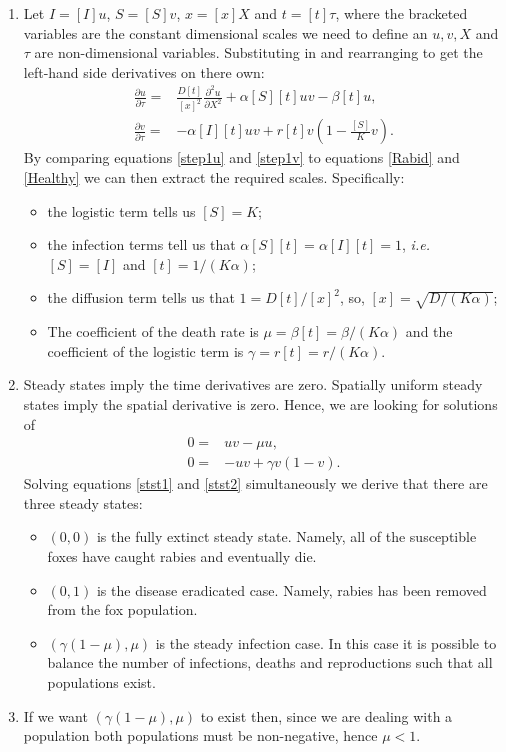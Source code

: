 \documentclass[10pt]{article}
\newcommand{\D}[2]{\frac{\partial #1}{\partial #2}}
\newcommand{\DD}[2]{\frac{\partial^2 #1}{\partial #2^2}}
\newcommand{\eqns}[2]{equations \eqref{#1} and \eqref{#2}}
\newcommand{\ie}{\emph{i.e.} }
\renewcommand{\l}{\left(}
\renewcommand{\r}{\right)}
\begin{document}
\begin{Answ}
\begin{enumerate}
\item Let $I=[I]u$, $S=[S]v$, $x=[x]X$ and $t=[t]\tau$, where the bracketed variables are the constant dimensional scales we need to define an $u, v, X$ and $\tau$ are non-dimensional variables. Substituting in and rearranging to get the left-hand side derivatives on there own:
\begin{align}
\D{u}{\tau}=&\frac{D[t]}{[x]^2}\DD{u}{X}+\alpha[S][t] uv-\beta [t]u,\label{step1u}\\
\D{v}{\tau}=&-\alpha[I][t] uv+r[t]v\l 1-\frac{[S]}{K}v\r.\label{step1v}
\end{align}
By comparing \eqns{step1u}{step1v} to \eqns{Rabid}{Healthy} we can then extract the required scales. Specifically:
\begin{itemize}
\item the logistic term tells us $[S]=K$;
\item the infection terms tell us that $\alpha[S][t]=\alpha[I][t]=1$, \ie $[S]=[I]$ and $[t]=1/(K\alpha)$;
\item the diffusion term tells us that $1=D[t]/[x]^2$, so, $[x]=\sqrt{D/(K\alpha)}$;
\item The coefficient of the death rate is $\mu=\beta[t]=\beta/(K\alpha)$ and the coefficient of the logistic term is $\gamma=r[t]=r/(K\alpha)$.
\end{itemize}
\item Steady states imply the time derivatives are zero. Spatially uniform steady states imply the spatial derivative is zero. Hence, we are looking for solutions of
\begin{align}
0=&uv-\mu u,\label{stst1}\\
0=&-uv+\gamma v\l 1-v\r.\label{stst2}
\end{align}
Solving \eqns{stst1}{stst2} simultaneously we derive that there are three steady states:
\begin{itemize}
\item $(0,0)$ is the fully extinct steady state. Namely, all of the susceptible foxes have caught rabies and eventually die.
\item $(0,1)$ is the disease eradicated case. Namely, rabies has been removed from the fox population.
\item $(\gamma(1-\mu),\mu)$ is the steady infection case.  In this case it is possible to balance the number of infections, deaths and reproductions such that all populations exist.
 \end{itemize}
 
 
 \item If we want $(\gamma(1-\mu),\mu)$ to exist then, since we are dealing with a population both populations must be non-negative, hence $\mu<1$.



\end{enumerate}
\end{Answ}
\end{document}

